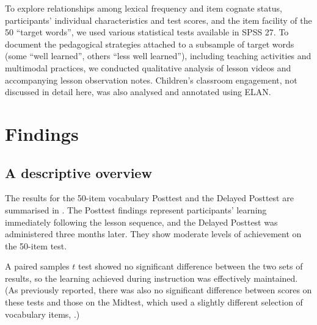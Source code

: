 \documentclass[output=paper]{langscibook}
\begin{document}
To explore relationships among lexical frequency and item cognate status, participants’ individual characteristics and test scores, and the item facility of the 50 “target words”, we used various statistical tests available in SPSS 27. To document the pedagogical strategies attached to a subsample of target words (some “well learned”, others “less well learned”), including teaching activities and multimodal practices, we conducted qualitative analysis of lesson videos and accompanying lesson observation notes. Children’s classroom engagement, not discussed in detail here, was also analysed and annotated using ELAN.

\section{Findings}\largerpage[2]
\subsection{A descriptive overview}

The results for the 50-item vocabulary Posttest and the Delayed Posttest are summarised in . The Posttest findings represent participants’ learning immediately following the lesson sequence, and the Delayed Posttest was administered three months later. They show moderate levels of achievement on the 50-item test.%


A paired samples $t$ test showed no significant difference between the two sets of results, so the learning achieved during instruction was effectively maintained. (As previously reported, there was also no significant difference between scores on these tests and those on the Midtest, which used a slightly different selection of vocabulary items, \citealt{MylesEtAl2012}.)
\end{document}

